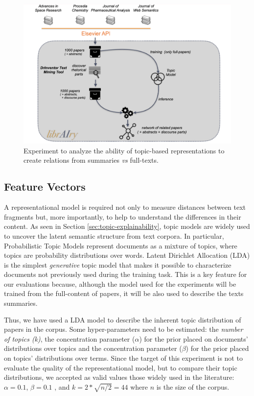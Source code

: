\begin{figure}[!htbp]
\centering
\includegraphics[scale=0.40]{similarity-experiment.png}
\caption{Experiment to analyze the ability of topic-based representations to create relations from summaries \textit{vs} full-texts. }
\label{fig:similarity-experiment}
\end{figure}

\subsection{Feature Vectors}
\label{sec:topicmodel}
A representational model is required not only to measure distances between text fragments but, more importantly, to help to understand the differences in their content. As seen in Section \ref{sec:topic-explainability}, topic models are widely used to uncover the latent semantic structure from text corpora. In particular, Probabilistic Topic Models represent documents as a mixture of topics, where topics are probability distributions over words. Latent Dirichlet Allocation (LDA)\citep{Blei2003} is the simplest \textit{generative} topic model that makes it possible to characterize documents not previously used during the training task. This is a key feature for our evaluations because, although the model used for the experiments will be trained from the full-content of papers, it will be also used to describe the texts summaries.

Thus, we have used a LDA model to describe the inherent topic distribution of papers in the corpus. Some hyper-parameters need to be estimated: the \textit{number of topics (k)}, the  concentration parameter ($\alpha$) for the prior placed on documents' distributions over topics and the concentration parameter ($\beta$) for the prior placed on topics’ distributions over terms. Since the target of this experiment is not to evaluate the quality of the representational model, but to compare their topic distributions, we accepted as valid values those widely used in the literature: $\alpha=0.1$, $\beta=0.1$ , and $k=2*\sqrt{n/2}=44$ where $n$ is the size of the corpus.



